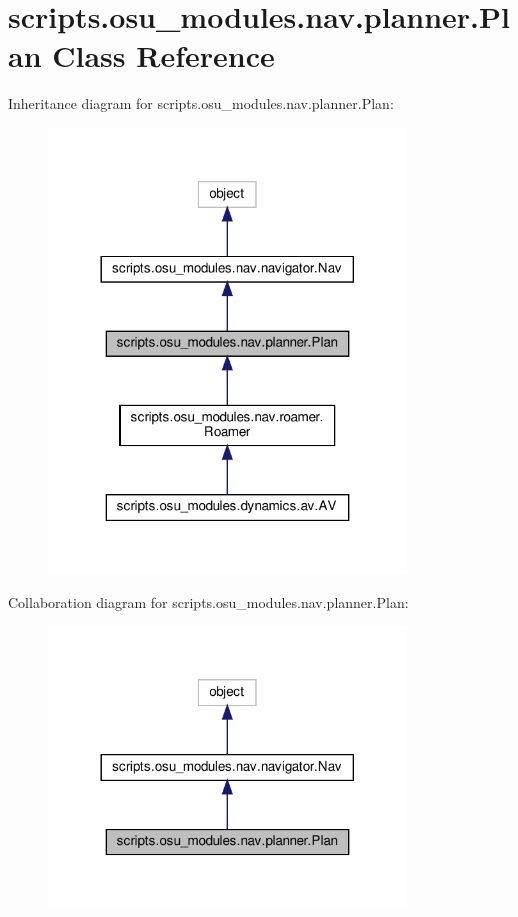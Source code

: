 \hypertarget{classscripts_1_1osu__modules_1_1nav_1_1planner_1_1Plan}{}\section{scripts.\+osu\+\_\+modules.\+nav.\+planner.\+Plan Class Reference}
\label{classscripts_1_1osu__modules_1_1nav_1_1planner_1_1Plan}


Inheritance diagram for scripts.\+osu\+\_\+modules.\+nav.\+planner.\+Plan\+:\nopagebreak
\begin{figure}[H]
\begin{center}
\leavevmode
\includegraphics[width=269pt]{d4/de2/classscripts_1_1osu__modules_1_1nav_1_1planner_1_1Plan__inherit__graph}
\end{center}
\end{figure}


Collaboration diagram for scripts.\+osu\+\_\+modules.\+nav.\+planner.\+Plan\+:\nopagebreak
\begin{figure}[H]
\begin{center}
\leavevmode
\includegraphics[width=269pt]{d0/d78/classscripts_1_1osu__modules_1_1nav_1_1planner_1_1Plan__coll__graph}
\end{center}
\end{figure}
